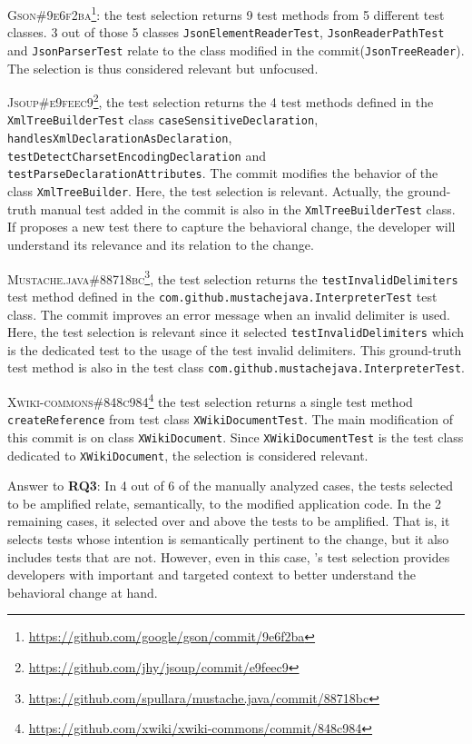 \textsc{Gson\#9e6f2ba}\footnote{\url{https://github.com/google/gson/commit/9e6f2ba}}: the test selection returns 9 test methods from 5 different test classes.
3 out of those 5 classes \texttt{JsonElementReaderTest}, \texttt{JsonReaderPathTest} and \texttt{JsonParserTest} relate to the class modified in the commit(\texttt{JsonTreeReader}).
The selection is thus considered relevant but unfocused.

\textsc{Jsoup\#e9feec9}\footnote{\url{https://github.com/jhy/jsoup/commit/e9feec9}}, the test selection returns the 4 test methods defined in the \texttt{XmlTreeBuilderTest} class \texttt{caseSensitiveDeclaration}, \texttt{handlesXmlDeclarationAsDeclaration}, \texttt{testDetectCharsetEncodingDeclaration} and \texttt{testParseDeclarationAttributes}.
The commit modifies the behavior of the class \texttt{XmlTreeBuilder}.
Here, the test selection is relevant.
Actually, the ground-truth manual test added in the commit is also in the \texttt{XmlTreeBuilderTest} class.
If \DCI proposes a new test there to capture the behavioral change, the developer will understand its relevance and its relation to the change.

\textsc{Mustache.java\#88718bc}\footnote{\url{https://github.com/spullara/mustache.java/commit/88718bc}}, the test selection returns the \texttt{testInvalidDelimiters} test method defined in the \texttt{com.github.mustachejava.InterpreterTest} test class.
The commit improves an error message when an invalid delimiter is used.
Here, the test selection is relevant since it selected \texttt{testInvalidDelimiters} which is the dedicated test to the usage of the test invalid delimiters.
This ground-truth test method is also in the test class \texttt{com.github.mustachejava.InterpreterTest}.

\textsc{Xwiki-commons\#848c984}\footnote{\url{https://github.com/xwiki/xwiki-commons/commit/848c984}} the test selection returns a single test method \texttt{createReference} from test class \texttt{XWikiDocumentTest}.
The main modification of this commit is on class \texttt{XWikiDocument}.
Since \texttt{XWikiDocumentTest} is the test class dedicated to \texttt{XWikiDocument}, the selection is considered relevant.

\begin{mdframed}
Answer to \textbf{RQ3}: 
In 4 out of 6 of the manually analyzed cases, the tests selected to be amplified relate, semantically, to the modified application code. 
In the 2 remaining cases, it selected over and above the tests to be amplified.
That is, it selects tests whose intention is semantically pertinent to the change, but it also includes tests that are not.
However, even in this case, \DCI's test selection provides developers with important and targeted context to better understand the behavioral change at hand.
\end{mdframed}


